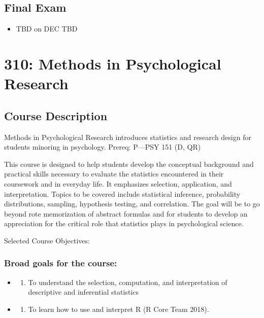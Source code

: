 \hypertarget{final-exam}{%
\section*{Final Exam}\label{final-exam}}


\begin{itemize}
\tightlist
\item
  TBD on DEC TBD
\end{itemize}

\hypertarget{statsminor}{%
\chapter*{310: Methods in Psychological Research}\label{statsminor}}


\hypertarget{course-description-1}{%
\section{Course Description}\label{course-description-1}}

Methods in Psychological Research introduces statistics and research design for students minoring in psychology. Prereq: P---PSY 151 (D, QR)

This course is designed to help students develop the conceptual background and practical skills necessary to evaluate the statistics encountered in their coursework and in everyday life. It emphasizes selection, application, and interpretation. Topics to be covered include statistical inference, probability distributions, sampling, hypothesis testing, and correlation. The goal will be to go beyond rote memorization of abstract formulas and for students to develop an appreciation for the critical role that statistics plays in psychological science.

Selected Course Objectives:

\hypertarget{broad-goals-for-the-course-1}{%
\subsection{Broad goals for the course:}\label{broad-goals-for-the-course-1}}

\begin{itemize}
\item
  \begin{enumerate}
  \def\labelenumi{\arabic{enumi}.}
  \tightlist
  \item
    To understand the selection, computation, and interpretation of descriptive and inferential
    statistics
  \end{enumerate}
\item
  \begin{enumerate}
  \def\labelenumi{\arabic{enumi}.}
  \setcounter{enumi}{1}
  \tightlist
  \item
    To learn how to use and interpret R (R Core Team 2018).
  \end{enumerate}
\end{itemize}

